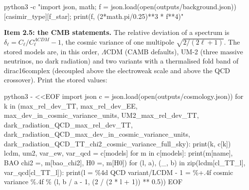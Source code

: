 \documentclass[
  10pt,
]{article}
\newenvironment{Shaded}{}{}
\newcommand{\NormalTok}[1]{#1}
\begin{document}
\begin{Shaded}
\begin{Highlighting}[]
\NormalTok{python3 {-}c "import json, math; f = json.load(open(\textquotesingle{}outputs/background.json\textquotesingle{}))[\textquotesingle{}casimir\_type\textquotesingle{}][\textquotesingle{}f\_star\textquotesingle{}]; print(f, (2*math.pi/0.25)**3 * f**4)"}
\end{Highlighting}
\end{Shaded}

\textbf{Item 2.5: the CMB statements.} The relative deviation of a
spectrum is \(\delta_\ell = C_\ell/C_\ell^{\Lambda CDM} - 1\), the
cosmic variance of one multipole \(\sqrt{2/(2\ell + 1)}\). The stored
models are, in this order, \(\Lambda\)CDM (CAMB defaults), UM-2 (three
massive neutrinos, no dark radiation) and two variants with a
thermalised fold band of dirac16complex (decoupled above the electroweak
scale and above the QCD crossover). Print the stored values:

\begin{Shaded}
\begin{Highlighting}[]
\NormalTok{python3 {-} \textless{}\textless{}\textquotesingle{}EOF\textquotesingle{}}
\NormalTok{import json}
\NormalTok{c = json.load(open(\textquotesingle{}outputs/cosmology.json\textquotesingle{}))}
\NormalTok{for k in (\textquotesingle{}max\_rel\_dev\_TT\textquotesingle{}, \textquotesingle{}max\_rel\_dev\_EE\textquotesingle{}, \textquotesingle{}max\_dev\_in\_cosmic\_variance\_units\textquotesingle{}, \textquotesingle{}UM2\_max\_rel\_dev\_TT\textquotesingle{},}
\NormalTok{          \textquotesingle{}dark\_radiation\_QCD\_max\_rel\_dev\_TT\textquotesingle{}, \textquotesingle{}dark\_radiation\_QCD\_max\_dev\_in\_cosmic\_variance\_units\textquotesingle{},}
\NormalTok{          \textquotesingle{}dark\_radiation\_QCD\_TT\_chi2\_cosmic\_variance\_full\_sky\textquotesingle{}):}
\NormalTok{    print(k, c[k])}
\NormalTok{lcdm, um2, var\_ew, var\_qcd = c[\textquotesingle{}models\textquotesingle{}]}
\NormalTok{for m in c[\textquotesingle{}models\textquotesingle{}]:}
\NormalTok{    print(m[\textquotesingle{}name\textquotesingle{}], \textquotesingle{} BAO chi2 =\textquotesingle{}, m[\textquotesingle{}bao\_chi2\textquotesingle{}], \textquotesingle{} H0 =\textquotesingle{}, m[\textquotesingle{}H0\textquotesingle{}])}
\NormalTok{for (l, a), (\_, b) in zip(lcdm[\textquotesingle{}cl\_TT\_l\textquotesingle{}], var\_qcd[\textquotesingle{}cl\_TT\_l\textquotesingle{}]):}
\NormalTok{    print(\textquotesingle{}l = \%4d  QCD variant/LCDM {-} 1 = \%+.4f   cosmic variance \%.4f\textquotesingle{} \% (l, b / a {-} 1, (2 / (2 * l + 1)) ** 0.5))}
\NormalTok{EOF}
\end{Highlighting}
\end{Shaded}
\end{document}
